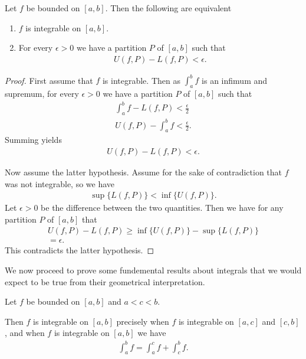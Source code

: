 \documentclass[]{article}
\begin{document}
\begin{thm}
		Let  $f$ be bounded on $[a,b]$.	 Then the following are equivalent
		\begin{enumerate}
				\item $f$ is integrable on $[a,b]$.
				\item For every $\epsilon > 0$ we have a partition $P$ of $[a,b]$ such  that 
						\begin{align*}
								U(f,P) - L(f,P) < \epsilon.
						\end{align*}
		\end{enumerate}
\end{thm}

\begin{proof}
		First assume that $f$ is integrable. Then as $\int_a^bf$ is an infimum and supremum, for every $\epsilon > 0$ we have a partition $P$ of $[a,b]$ such that
		\begin{align*}
				\int_a^bf - L(f,P) < \frac{\epsilon}{2}  \\
				U(f,P) - \int_a^bf < \frac{\epsilon}{2}.
		\end{align*}
		Summing yields
		\begin{align*}
				U(f,P) - L(f,P) < \epsilon.
		\end{align*}
		
		Now assume the latter hypothesis. Assume for the sake of contradiction that $f$ was not integrable, so we have
		\begin{align*}
				\sup\{L(f,P)\} < \inf\{U(f,P)\}.
		\end{align*}
		Let $\epsilon > 0$ be the difference between the two quantities. Then we have for any partition $P$ of $[a,b]$ that
		\begin{align*}
				U(f,P) - L(f,P) \geq \inf\{U(f,P)\} - \sup\{L(f,P)\} \\
				= \epsilon.
		\end{align*}
		This contradicts the latter hypothesis.
\end{proof}

We now proceed to prove some fundemental results about integrals that we would expect to be true from their geometrical interpretation.

\begin{thm}
		Let $f$ be bounded on $[a,b]$ and $a < c < b$. 

		Then $f$ is integrable on $[a,b]$ precisely when $f$ is integrable on $[a,c]$ and $[c,b]$, and when $f$ is integrable on $[a,b]$ we have
\begin{align*}
		\int_a^bf = \int_a^cf + \int_c^bf.
\end{align*}
\end{thm}
\end{document}
